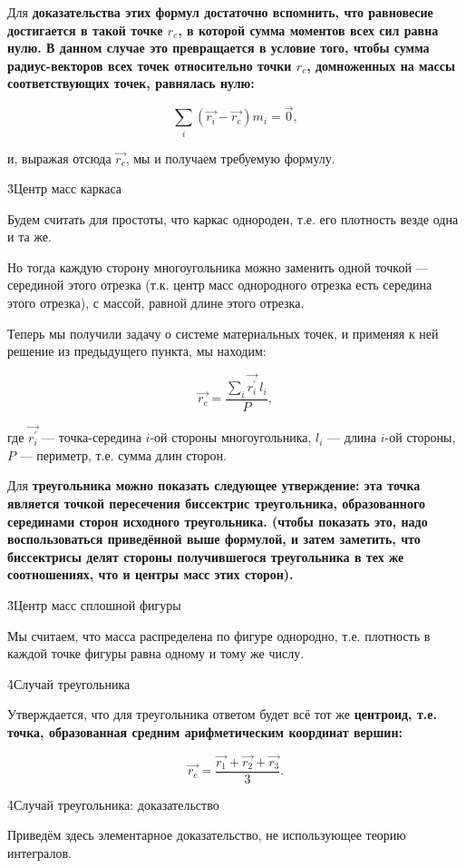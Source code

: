 Для \bf{доказательства} этих формул достаточно вспомнить, что равновесие достигается в такой точке $r_c$, в которой сумма моментов всех сил равна нулю. В данном случае это превращается в условие того, чтобы сумма радиус-векторов всех точек относительно точки $r_c$, домноженных на массы соответствующих точек, равнялась нулю:

$$ \sum\limits_i \left( \vec{r_i} - \vec{r_c} \right) m_i = \vec{0}, $$

и, выражая отсюда $\vec{r_c}$, мы и получаем требуемую формулу.


\h3{Центр масс каркаса}

Будем считать для простоты, что каркас однороден, т.е. его плотность везде одна и та же.

Но тогда каждую сторону многоугольника можно заменить одной точкой --- серединой этого отрезка (т.к. центр масс однородного отрезка есть середина этого отрезка), с массой, равной длине этого отрезка.

Теперь мы получили задачу о системе материальных точек, и применяя к ней решение из предыдущего пункта, мы находим:

$$ \vec{r_c} = \frac{ \sum\limits_i \vec{r_i^\prime} ~ l_i }{ P }, $$

где $\vec{r_i^\prime}$ --- точка-середина $i$-ой стороны многоугольника, $l_i$ --- длина $i$-ой стороны, $P$ --- периметр, т.е. сумма длин сторон.

Для \bf{треугольника} можно показать следующее утверждение: эта точка является \bf{точкой пересечения биссектрис} треугольника, образованного серединами сторон исходного треугольника. (чтобы показать это, надо воспользоваться приведённой выше формулой, и затем заметить, что биссектрисы делят стороны получившегося треугольника в тех же соотношениях, что и центры масс этих сторон).


\h3{Центр масс сплошной фигуры}

Мы считаем, что масса распределена по фигуре однородно, т.е. плотность в каждой точке фигуры равна одному и тому же числу.

\h4{Случай треугольника}

Утверждается, что для треугольника ответом будет всё тот же \bf{центроид}, т.е. точка, образованная средним арифметическим координат вершин:

$$ \vec{r_c} = \frac{ \vec{r_1} + \vec{r_2} + \vec{r_3} }{ 3 }. $$

\h4{Случай треугольника: доказательство}

Приведём здесь элементарное доказательство, не использующее теорию интегралов. 

